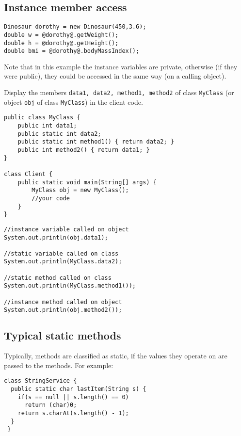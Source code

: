 \newpage
\subsection{Instance member access}

\begin{lstlisting}[style=buggy]
Dinosaur dorothy = new Dinosaur(450,3.6);
double w = @dorothy@.getWeight();
double h = @dorothy@.getHeight();
double bmi = @dorothy@.bodyMassIndex();
\end{lstlisting}

Note that in this example the instance variables are private, otherwise (if they were public), they could be accessed in the same way (on a calling object).

\begin{exercise}
Display the members \texttt{data1, data2, method1, method2} of class \texttt{MyClass} (or object \texttt{obj} of class \texttt{MyClass}) in the client code.

\begin{lstlisting}[frame=single,style=buggy]
public class MyClass {
	public int data1;
	public static int data2;
	public static int method1() { return data2; }
	public int method2() { return data1; }
}

class Client {
	public static void main(String[] args) {
		MyClass obj = new MyClass();
		//your code	
	}
}
\end{lstlisting}  	
\end{exercise}
\begin{answer} \begin{lstlisting}
//instance variable called on object
System.out.println(obj.data1); 

//static variable called on class
System.out.println(MyClass.data2); 

//static method called on class
System.out.println(MyClass.method1()); 

//instance method called on object 
System.out.println(obj.method2()); 
\end{lstlisting} \end{answer}

\subsection{Typical static methods}
Typically, methods are classified as static, if the values they operate on are passed to the methods. For example:

\begin{lstlisting}[basicstyle=\footnotesize]
class StringService {
  public static char lastItem(String s) {
    if(s == null || s.length() == 0)
      return (char)0;
    return s.charAt(s.length() - 1);
  }
 }
\end{lstlisting}


